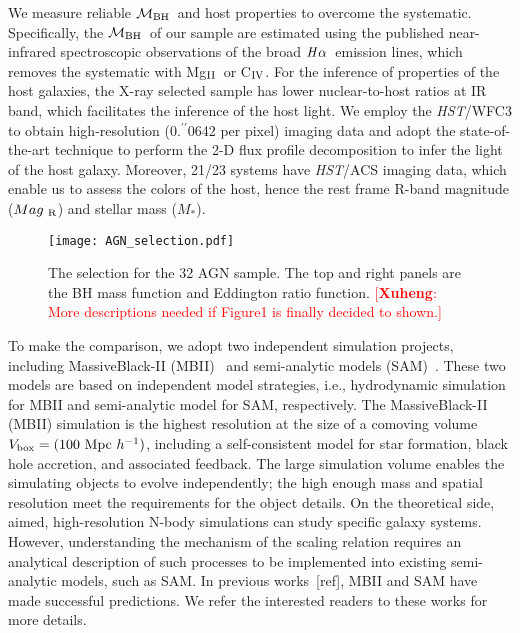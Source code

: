 \documentclass{natureprintstyle}
\newcommand{\hst}{{\it HST}}
\newcommand{\mbh}{$\mathcal M_{\rm BH}$}
\newcommand{\mr}{$Mag_{\rm ~R}$}
\newcommand{\halpha}{${\it H}\alpha$}
\newcommand{\mstar}{{$M_*$}}
\newcommand{\Mgii}{Mg$_{\rm II}$}
\newcommand{\Civ}{C$_{\rm IV}$}
\newcommand{\farcs}{\mbox{\ensuremath{.\!\!^{\prime\prime}}}}%
\newcommand{\ding}[1]{\textcolor{red}{[{\bf Xuheng}: #1]}}
\begin{document}
We measure reliable \mbh\ and host properties to overcome the systematic. Specifically, the \mbh\ of our sample are estimated using the published near-infrared spectroscopic observations of the broad \halpha\ emission lines, which removes the systematic with \Mgii\ or \Civ. For the inference of properties of the host galaxies, the X-ray selected sample has lower nuclear-to-host ratios at IR band, which facilitates the inference of the host light. We employ the \hst/WFC3 to obtain high-resolution (0\farcs0642 per pixel) imaging data and adopt the state-of-the-art technique to perform the 2-D flux profile decomposition to infer the light of the host galaxy. Moreover, 21/23 systems have \hst/ACS imaging data, which enable us to assess the colors of the host, hence the rest frame R-band magnitude (\mr) and stellar mass (\mstar). 

\begin{figure}[t]
\texttt{[image: AGN\_selection.pdf]}
\caption{The selection for the 32 AGN sample. The top and right panels are the BH mass function and Eddington ratio function. \ding{More descriptions needed if Figure1 is finally decided to shown.}
}
\label{fig:AGN_select}
\end{figure}

To make the comparison, we adopt two independent simulation projects, including MassiveBlack-II (MBII)~\cite{Khandai2015} and semi-analytic models (SAM)~\cite{Menci2014}. These two models are based on independent model strategies, i.e., hydrodynamic simulation for MBII and semi-analytic model for SAM, respectively. The MassiveBlack-II (MBII) simulation is the highest resolution at the size of a comoving volume $V_{\rm box} = (100~{\rm Mpc}~h^{-1})$, including a self-consistent model for star formation, black hole accretion, and associated feedback. The large simulation volume enables the simulating objects to evolve independently; the high enough mass and spatial resolution meet the requirements for the object details. On the theoretical side, aimed, high-resolution N-body simulations can study specific galaxy systems. However, understanding the mechanism of the scaling relation requires an analytical description of such processes to be implemented into existing semi-analytic models, such as SAM. In previous works~\cite{Menci2014, Menci2016}[ref], MBII and SAM have made successful predictions. We refer the interested readers to these works for more details.
\end{document}
